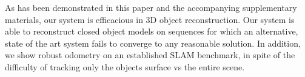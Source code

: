 As has been demonstrated in this paper and the accompanying supplementary materials, our system is efficacious in 3D object 
reconstruction. Our system is able to reconstruct closed object models on sequences for which an alternative, state of 
the art system \cite{Ren2013} fails to converge to any reasonable solution. In addition, we show robust odometry on an 
established SLAM benchmark, in spite of the difficulty of tracking only the objects surface vs the entire scene.